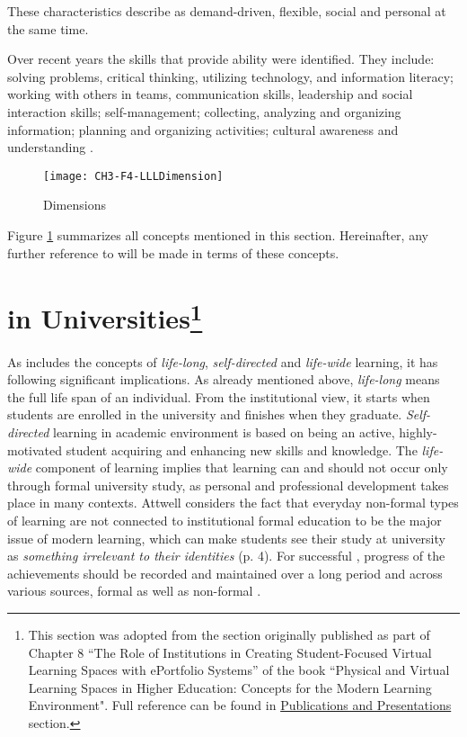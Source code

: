 These characteristics describe \LLLs as demand-driven, flexible, social and
personal at the same time. 

Over recent years the skills that provide \LLLs ability were identified. They
include: solving problems, critical thinking, utilizing technology, and
information literacy; working with others in teams, communication skills,
leadership and social interaction skills; self-management; collecting, analyzing
and organizing information; planning and organizing activities; cultural
awareness and understanding
\citep{Brooks2008,Heinrich2007,Otala1997,Pitman2009}. 

\begin{figure}[htb]
\centering
\texttt{[image: CH3-F4-LLLDimension]}
\caption{\LLLc Dimensions}
\label{fig:llldim}
\end{figure}

Figure \ref{fig:llldim} summarizes all concepts mentioned in this section.
Hereinafter, any further reference to \LLLs will be made in terms of these
concepts.

\section[\LLLc in Universities]{\LLLc in Universities\footnote{This section was
adopted from the section originally published as part of Chapter 8 ``The Role of
Institutions in Creating Student-Focused Virtual Learning Spaces with ePortfolio
Systems'' of the book ``Physical and Virtual Learning Spaces in Higher
Education: Concepts for the Modern Learning Environment". Full reference can be
found in \hyperref[sec:pub]{Publications and Presentations} section.} }

\label{sec:uni}

As \LLLs includes the concepts of \textit{life-long}, \textit{self-directed}
and \textit{life-wide} learning, it has following significant implications. As
already mentioned above, \textit{life-long} means the full life span of an
individual. From the institutional view, it starts when students are enrolled in
the university and finishes when they graduate. \textit{Self-directed} learning
in academic environment is based on being an active, highly-motivated student
acquiring and enhancing new skills and knowledge. The \textit{life-wide}
component of learning implies that learning can and should not occur only
through formal university study, as personal and professional development takes
place in many contexts. Attwell \citeyearpar{Attwell2007} considers the fact
that everyday non-formal types of learning are not connected to institutional
formal education to be the major issue of modern learning, which can make
students see their study at university as \textit{something irrelevant to their
identities} (p. 4). For successful \LLLsn, progress of the achievements should
be recorded and maintained over a long period and across various sources, formal
as well as non-formal \citep{Kay2008}.

